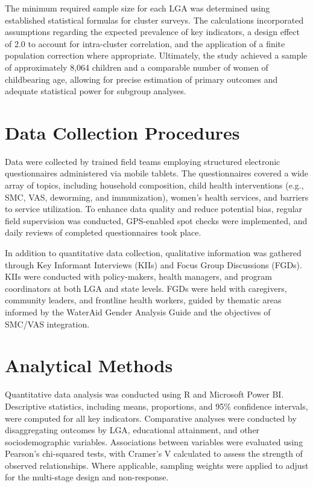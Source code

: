 \documentclass[
  11pt,
]{report}
\begin{document}
The minimum required sample size for each LGA was determined using
established statistical formulas for cluster surveys. The calculations
incorporated assumptions regarding the expected prevalence of key
indicators, a design effect of 2.0 to account for intra-cluster
correlation, and the application of a finite population correction where
appropriate. Ultimately, the study achieved a sample of approximately
8,064 children and a comparable number of women of childbearing age,
allowing for precise estimation of primary outcomes and adequate
statistical power for subgroup analyses.

\section{Data Collection Procedures}\label{data-collection-procedures}

Data were collected by trained field teams employing structured
electronic questionnaires administered via mobile tablets. The
questionnaires covered a wide array of topics, including household
composition, child health interventions (e.g., SMC, VAS, deworming, and
immunization), women's health services, and barriers to service
utilization. To enhance data quality and reduce potential bias, regular
field supervision was conducted, GPS-enabled spot checks were
implemented, and daily reviews of completed questionnaires took place.

In addition to quantitative data collection, qualitative information was
gathered through Key Informant Interviews (KIIs) and Focus Group
Discussions (FGDs). KIIs were conducted with policy-makers, health
managers, and program coordinators at both LGA and state levels. FGDs
were held with caregivers, community leaders, and frontline health
workers, guided by thematic areas informed by the WaterAid Gender
Analysis Guide and the objectives of SMC/VAS integration.

\section{Analytical Methods}\label{analytical-methods}

Quantitative data analysis was conducted using R and Microsoft Power BI.
Descriptive statistics, including means, proportions, and 95\%
confidence intervals, were computed for all key indicators. Comparative
analyses were conducted by disaggregating outcomes by LGA, educational
attainment, and other sociodemographic variables. Associations between
variables were evaluated using Pearson's chi-squared tests, with
Cramer's V calculated to assess the strength of observed relationships.
Where applicable, sampling weights were applied to adjust for the
multi-stage design and non-response.
\end{document}
